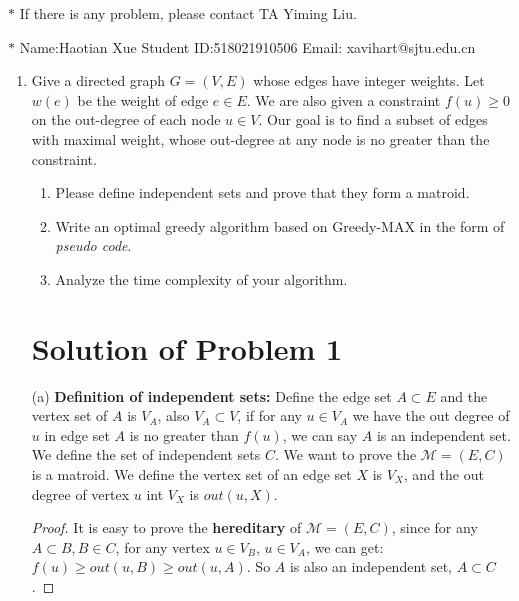 \documentclass[12pt,a4paper]{article}
\theoremstyle{definition}
\begin{document}
\renewcommand\tablename{Table}
\noindent

\noindent{}
\begin{center}
\footnotesize{\color{red}$*$ If there is any problem, please contact TA Yiming Liu.}

\footnotesize{\color{blue}$*$ Name:Haotian Xue  \quad Student ID:518021910506 \quad Email: xavihart@sjtu.edu.cn}
\end{center}

\begin{enumerate}
\item Give a directed graph $G=(V,E)$ whose edges have integer weights. Let $w(e)$ be the weight of edge $e\in E$. We are also given a constraint $f(u)\geq 0$ on the out-degree of each node $u\in V$. Our goal is to find a subset of edges with maximal weight, whose out-degree at any node is no greater than the constraint.
	\begin{enumerate}
	    \item Please define independent sets and prove that they form a matroid.
	    \item Write an optimal greedy algorithm based on Greedy-MAX in the form of \emph{pseudo code}.
	    \item Analyze the time complexity of your algorithm.
	\end{enumerate}


\section*{Solution of Problem 1}

	(a) \textbf{Definition of independent sets:} Define the edge set $A \subset E$ and the vertex set of $A$ is $V_A$, also $V_A \subset V$, 
	if for any $u \in V_A$ we have the out degree of $u$ in edge set $A$ is no greater than $f(u)$, we can say $A$ is an independent set. 	
	We define the set of independent sets $C$. We want to prove the $\mathcal{M} = (E, C)$ is a matroid. We define the vertex set of an edge set $X$ is $V_X$, and 
	the out degree of vertex $u$ int $V_X$ is $out(u, X)$. 
	\begin{proof}
		It is easy to prove the \textbf{hereditary} of $\mathcal{M}=(E, C)$, since for any $A \subset B, B \in C$, for any vertex $u \in V_B$, $u \in V_A$, we can get:
		$f(u) \geq out(u, B) \geq out(u, A)$. So $A$ is also an independent set, $A \subset C$.


\end{proof}
\end{enumerate}
\end{document}
